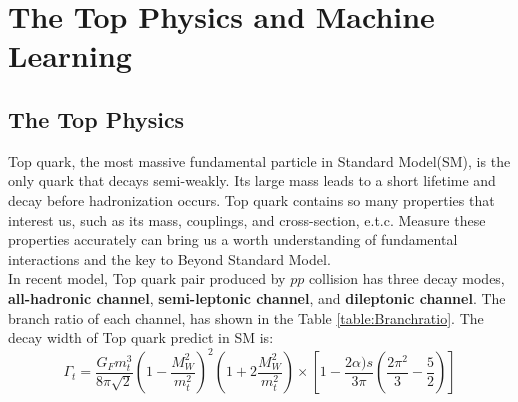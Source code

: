 
\chapter{The Top Physics and Machine Learning}

\section{The Top Physics}

Top quark, the most massive fundamental particle in Standard Model(SM), is the only quark that decays semi-weakly. Its large mass leads to a short lifetime and decay before hadronization occurs. Top quark contains so many properties that interest us, such as its mass, couplings, and cross-section, e.t.c. Measure these properties accurately can bring us a worth understanding of fundamental interactions and the key to Beyond Standard Model.\cite{Zyla:2020zbs}
\\
In recent model, Top quark pair produced by $pp$ collision has three decay modes, \textbf{all-hadronic channel}, \textbf{semi-leptonic channel}, and \textbf{dileptonic channel}. The branch ratio of each channel, has shown in the Table \ref{table:Branchratio}. The decay width of Top quark predict in SM is\cite{A.Quadt:2008TopPhysics}: 
\begin{equation}
	\Gamma_{t} = \frac{G_{F}m_{t}^{3}}{8\pi\sqrt{2}}\left(1-\frac{M_{W}^{2}}{m_{t}^{2}}\right)^{2}\left(1+2\frac{M_{W}^{2}}{m_{t}^{2}}\right)\times\left[1 - \frac{2\alpha){s}}{3\pi}\left( \frac{2\pi^{2}}{3} - \frac{5}{2}\right) \right]
\end{equation}
\\

